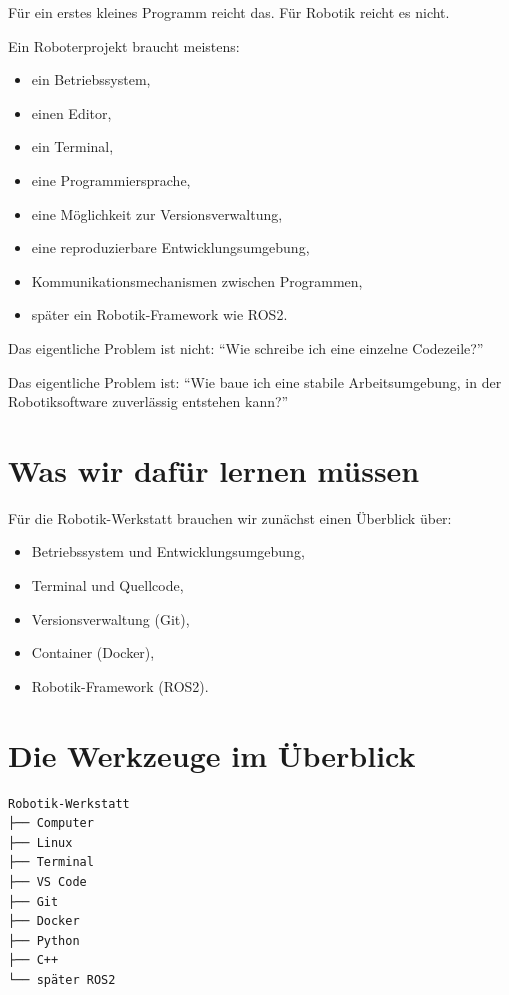 Für ein erstes kleines Programm reicht das. Für Robotik reicht es nicht.

Ein Roboterprojekt braucht meistens:
\begin{itemize}
  \item ein Betriebssystem,
  \item einen Editor,
  \item ein Terminal,
  \item eine Programmiersprache,
  \item eine Möglichkeit zur Versionsverwaltung,
  \item eine reproduzierbare Entwicklungsumgebung,
  \item Kommunikationsmechanismen zwischen Programmen,
  \item später ein Robotik-Framework wie ROS2.
\end{itemize}

\begin{problemBox}
Das eigentliche Problem ist nicht: \enquote{Wie schreibe ich eine einzelne Codezeile?}

Das eigentliche Problem ist: \enquote{Wie baue ich eine stabile Arbeitsumgebung,
in der Robotiksoftware zuverlässig entstehen kann?}
\end{problemBox}

\section{Was wir dafür lernen müssen}

\begin{wissenBox}
Für die Robotik-Werkstatt brauchen wir zunächst einen Überblick über:
\begin{itemize}
  \item Betriebssystem und Entwicklungsumgebung,
  \item Terminal und Quellcode,
  \item Versionsverwaltung (Git),
  \item Container (Docker),
  \item Robotik-Framework (ROS2).
\end{itemize}
\end{wissenBox}

\section{Die Werkzeuge im Überblick}

\begin{lstlisting}[style=text]
Robotik-Werkstatt
├── Computer
├── Linux
├── Terminal
├── VS Code
├── Git
├── Docker
├── Python
├── C++
└── später ROS2
\end{lstlisting}

